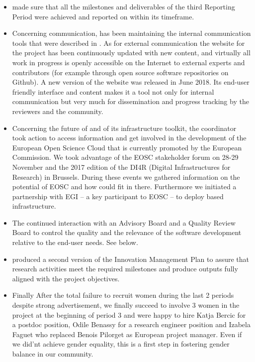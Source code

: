 \begin{itemize}
\item {} made sure that all the milestones and deliverables of
  the third Reporting Period were achieved and reported on within its
  timeframe.
\item Concerning communication,  has been maintaining the
  internal communication tools that were described in
  . As for external
  communication the website for the project has been continuously
  updated with new content, and virtually all work in progress is
  openly accessible on the Internet to external experts and
  contributors (for example through open source software repositories
  on Github). A new version of the website was released in June 2018.
  Its end-user friendly interface and content makes it a tool not only
  for internal communication but very much for dissemination and
  progress tracking by the reviewers and the community.
\item Concerning the future of \ODK and of its infrastructure toolkit,
  the coordinator took action to access information and get involved
  in the development of the European Open Science Cloud that is
  currently promoted by the European Commission. We took advantage of
  the EOSC stakeholder forum on 28-29 November and the 2017 edition of
  the DI4R (Digital Infrastructures for Research) in Brussels. During
  these events we gathered information on the potential of EOSC and
  how \ODK could fit in there. Furthermore we initiated a partnership
  with EGI -- a key participant to EOSC -- to deploy \ODK based
  infrastructure.
\item The continued interaction with an Advisory Board and a Quality
  Review Board to control the quality and the relevance of the
  software development relative to the end-user needs. See below.
\item {} produced a second version of the Innovation Management Plan
 to assure that research activities meet the required milestones and produce outputs fully aligned with the project objectives.
 
\item Finally After the total failure to recruit women during the 
last 2 periods despite strong advertisement, we finally succeed to involve 3 women in the project
at the beginning of period 3 and were happy to hire Katja Bercic for a postdoc position, 
Odile Benassy for a research engineer position and Izabela Faguet who replaced Benois Pilorget as European project manager. 
Even if we did'nt achieve gender equality, this is a first step in fostering gender balance in our community.


\end{itemize}
